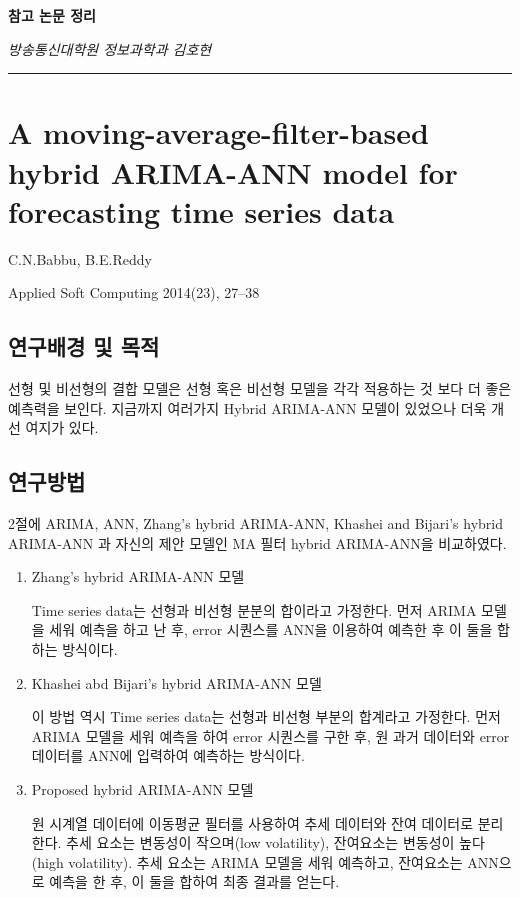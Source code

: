 \documentclass[ %
    a4paper,    %
    amsmath,    %
    itemph,     %
11pt]{oblivoir}     %
\begin{document}
\begin{center}
\Large{\textbf{참고 논문 정리}}
\end{center}


\begin{flushright}
\textit{방송통신대학원 정보과학과 김호현} \\
\end{flushright}
\vspace{-5mm}
\noindent\rule{\textwidth}{.5pt}

\vspace{-5mm}
\section{A moving-average-filter-based hybrid ARIMA-ANN model for forecasting time series data\cite{babu2014}}

\begin{description}\tightlist
\item[저자] C.N.Babbu, B.E.Reddy
\item[학술지] Applied Soft Computing 2014(23), 27--38
\end{description}

\subsection{연구배경 및 목적}
선형 및 비선형의 결합 모델은 선형 혹은 비선형 모델을 각각 적용하는 것 보다 더 좋은 예측력을 보인다.  지금까지 여러가지 Hybrid ARIMA-ANN 모델이 있었으나 더욱 개선 여지가 있다.  

\subsection{연구방법}

2절에 ARIMA, ANN, Zhang's hybrid ARIMA-ANN, Khashei and Bijari's hybrid ARIMA-ANN 과 자신의 제안 모델인 MA 필터 hybrid ARIMA-ANN을 비교하였다.

\begin{enumerate}
\item Zhang's hybrid ARIMA-ANN 모델

Time series data는 선형과 비선형 분분의 합이라고 가정한다. 먼저 ARIMA 모델을 세워 예측을 하고 난 후, error 시퀀스를 ANN을 이용하여 예측한 후 이 둘을 합하는 방식이다.

\item Khashei abd Bijari's hybrid ARIMA-ANN 모델

이 방법 역시 Time series data는 선형과 비선형 부분의 합계라고 가정한다. 먼저 ARIMA 모델을 세워 예측을 하여 error 시퀀스를 구한 후, 원 과거 데이터와 error 데이터를 ANN에 입력하여 예측하는 방식이다.

\item Proposed hybrid ARIMA-ANN 모델

원 시계열 데이터에 이동평균 필터를 사용하여 추세 데이터와 잔여 데이터로 분리한다. 추세 요소는 변동성이 작으며(low volatility), 잔여요소는 변동성이 높다(high volatility).
추세 요소는 ARIMA 모델을 세워 예측하고, 잔여요소는 ANN으로 예측을 한 후, 이 둘을 합하여 최종 결과를 얻는다.
\end{enumerate}
\end{document}
